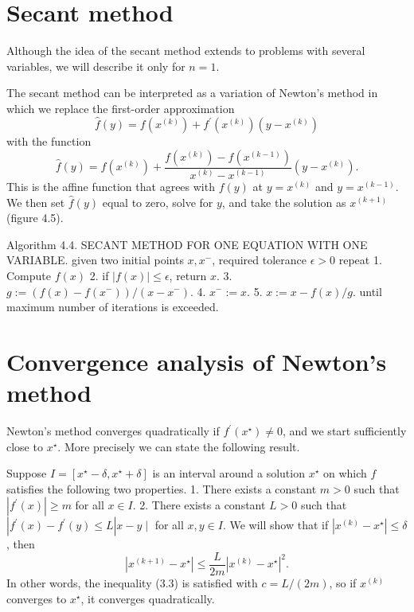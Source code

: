 \section{Secant method}

Although the idea of the secant method extends to problems with several variables,
we will describe it only for $n = 1$.

The secant method can be interpreted as a variation of Newton's method in which we replace the first-order approximation
$$
\hat{f}(y)=f\left(x^{(k)}\right)+f^{\prime}\left(x^{(k)}\right)\left(y-x^{(k)}\right)
$$
with the function
$$
\hat{f}(y)=f\left(x^{(k)}\right)+\frac{f\left(x^{(k)}\right)-f\left(x^{(k-1)}\right)}{x^{(k)}-x^{(k-1)}}\left(y-x^{(k)}\right) .
$$
This is the affine function that agrees with $ f(y) $ at $ y=x^{(k)} $ and $ y=x^{(k-1)} $. We then set $ \hat{f}(y) $ equal to zero, solve for $ y $, and take the solution as $ x^{(k+1)} $ (figure 4.5).

\begin{algorithm}
    Algorithm 4.4. SECANT METHOD FOR ONE EQUATION WITH ONE VARIABLE.
given two initial points $ x, x^{-} $, required tolerance $ \epsilon>0 $
repeat
1. Compute $ f(x) $
2. if $ |f(x)| \leq \epsilon $, return $ x $.
3. $ g:=\left(f(x)-f\left(x^{-}\right)\right) /\left(x-x^{-}\right) $.
4. $ x^{-}:=x $.
5. $ x:=x-f(x) / g $.
until maximum number of iterations is exceeded.
\end{algorithm}

\section{ Convergence analysis of Newton’s method}

Newton's method converges quadratically if $ f^{\prime}\left(x^{\star}\right) \neq 0 $, and we start sufficiently close to $ x^{\star} $. More precisely we can state the following result.

Suppose $ I=\left[x^{\star}-\delta, x^{\star}+\delta\right] $ is an interval around a solution $ x^{\star} $ on which $ f $ satisfies the following two properties.
1. There exists a constant $ m>0 $ such that $ \left|f^{\prime}(x)\right| \geq m $ for all $ x \in I $.
2. There exists a constant $ L>0 $ such that $ \left|f^{\prime}(x)-f^{\prime}(y) \leq L\right| x-y \mid $ for all $ x, y \in I $.
We will show that if $ \left|x^{(k)}-x^{\star}\right| \leq \delta $, then
$$
\left|x^{(k+1)}-x^{\star}\right| \leq \frac{L}{2 m}\left|x^{(k)}-x^{\star}\right|^{2} .
$$
In other words, the inequality (3.3) is satisfied with $ c=L /(2 m) $, so if $ x^{(k)} $ converges to $ x^{\star} $, it converges quadratically.

